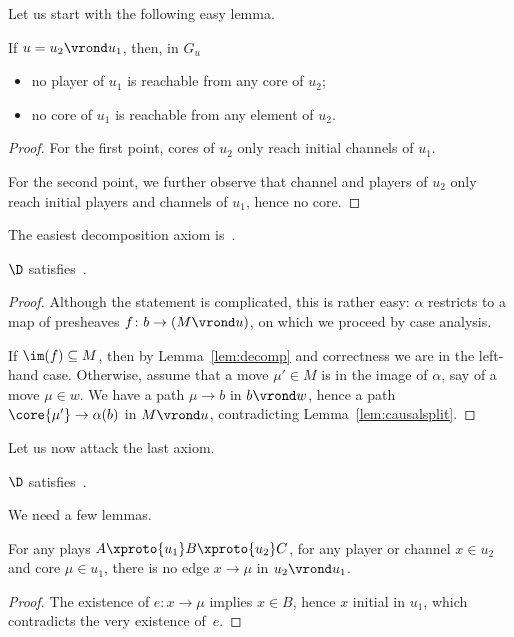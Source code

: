 \documentclass{LMCS}
\theoremstyle{plain}\newtheorem{satz}[thm]{Satz}
\begin{document}
Let us start with the following easy lemma.
\begin{lem}\label{lem:causalsplit}
  If $u = u_2 \vrond u_1$, then, in $G_u$
  \begin{itemize}
  \item no player of $u_1$ is reachable from any core of
    $u_2$;
  \item no core of $u_1$ is reachable from any element of
    $u_2$.
  \end{itemize}
\end{lem}
\begin{proof}
  For the first point, cores of $u_2$ only reach initial channels of $u_1$.

  For the second point, we further observe that channel and players of $u_2$
  only reach initial players and channels of $u_1$, hence no core.
\end{proof}

The easiest decomposition axiom is~.
\begin{lem}\label{lem:decompsym}
  $\D$ satisfies~.
\end{lem}

\begin{proof}
  Although the statement is complicated, this is rather easy: $\alpha$
  restricts to a map of presheaves $f \colon b \to (M \vrond u)$, on which we
  proceed by case analysis.

  If $\im (f) \subseteq M$, then by Lemma~\ref{lem:decomp} and
  correctness we are in the left-hand case.  Otherwise, assume that a
  move $\mu' \in M$ is in the image of $\alpha$, say of a move $\mu
  \in w$. We have a path $\mu \to b$ in $b \vrond w$, hence a path
  $\core{\mu'} \to \alpha(b)$ in $M \vrond u$, contradicting
  Lemma~\ref{lem:causalsplit}.
\end{proof}

Let us now attack the last axiom.
\begin{lem}\label{lem:decompleft}
$\D$ satisfies~.
\end{lem}

We need a few lemmas.


\begin{lem}\label{lem:causalcompo}
  For any plays $A \xproto{u_1} B \xproto{u_2} C$, for any player or channel
  $x \in u_2$ and core $\mu \in u_1$, there is no edge $x \to \mu$ in
  $u_2 \vrond u_1$.
\end{lem}
\begin{proof}
  The existence of $e \colon x \to \mu$ implies $x \in B$, hence $x$
  initial in $u_1$, which contradicts the very existence of~$e$.
\end{proof}
\end{document}

